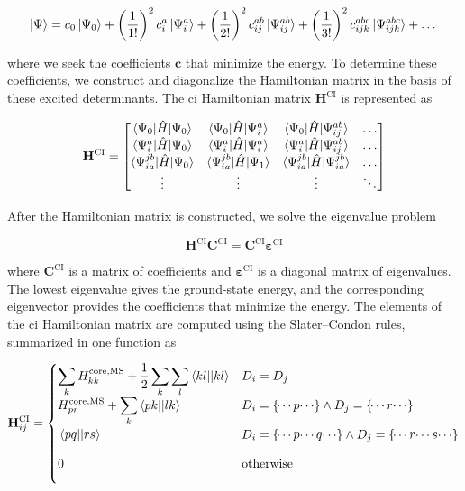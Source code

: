 \begin{equation}
\ket{\Psi}=c_0\ket{\Psi_0}+\left(\frac{1}{1!}\right)^2c_i^a\ket{\Psi_i^a}+\left(\frac{1}{2!}\right)^2c_{ij}^{ab}\ket{\Psi_{ij}^{ab}}+\left(\frac{1}{3!}\right)^2c_{ijk}^{abc}\ket{\Psi_{ijk}^{abc}}+\dots
\end{equation}

where we seek the coefficients \(\mathbf{c}\) that minimize the energy. To determine these coefficients, we construct and diagonalize the Hamiltonian matrix in the basis of these excited determinants. The \acrshort{ci} Hamiltonian matrix \(\mathbf{H}^{\mathrm{CI}}\) is represented as

\begin{equation}\label{eq:ci-hamiltonian}
\mathbf{H}^{\mathrm{CI}}=
\begin{bmatrix}
\braket{\Psi_0|\hat{H}|\Psi_0} & \braket{\Psi_0|\hat{H}|\Psi_i^a} & \braket{\Psi_0|\hat{H}|\Psi_{ij}^{ab}} & \dots \\
\braket{\Psi_i^a|\hat{H}|\Psi_0} & \braket{\Psi_i^a|\hat{H}|\Psi_i^a} & \braket{\Psi_i^a|\hat{H}|\Psi_{ij}^{ab}} & \dots \\
\braket{\Psi_{ia}^{jb}|\hat{H}|\Psi_0} & \braket{\Psi_{ia}^{jb}|\hat{H}|\Psi_1} & \braket{\Psi_{ia}^{jb}|\hat{H}|\Psi_{ia}^{jb}} & \dots \\
\vdots & \vdots & \vdots & \ddots
\end{bmatrix}
\end{equation}

After the Hamiltonian matrix is constructed, we solve the eigenvalue problem

\begin{equation}\label{eq:ci-eigenvalue-problem}
\mathbf{H}^{\mathrm{CI}}\mathbf{C}^{\mathrm{CI}}=\mathbf{C}^{\mathrm{CI}}\bm{\varepsilon}^{\mathrm{CI}}
\end{equation}

where \(\mathbf{C}^{\mathrm{CI}}\) is a matrix of coefficients and \(\bm{\varepsilon}^{\mathrm{CI}}\) is a diagonal matrix of eigenvalues. The lowest eigenvalue gives the ground-state energy, and the corresponding eigenvector provides the coefficients that minimize the energy. The elements of the \acrshort{ci} Hamiltonian matrix are computed using the Slater--Condon rules, summarized in one function as

\begin{equation}\label{eq:slater-condon-rules}
\mathbf{H}_{ij}^{\mathrm{CI}}=
\begin{cases} 
\displaystyle \sum_kH_{kk}^{\mathrm{core},\mathrm{MS}}+\frac{1}{2}\sum_k\sum_l\braket{kl||kl}&D_i=D_j \\
\displaystyle H_{pr}^{\mathrm{core},\mathrm{MS}}+\sum_k\braket{pk||lk}&D_i=\left\lbrace\dotsi p\dotsi\right\rbrace\land D_j=\left\lbrace\dotsi r\dotsi\right\rbrace \\
\displaystyle \vphantom{\sum_k}\braket{pq||rs}&D_i=\left\lbrace\dotsi p\dotsi q\dotsi\right\rbrace\land D_j=\left\lbrace\dotsi r\dotsi s\dotsi\right\rbrace \\
\displaystyle \vphantom{\sum_k}0&\text{otherwise}
\end{cases}
\end{equation}

